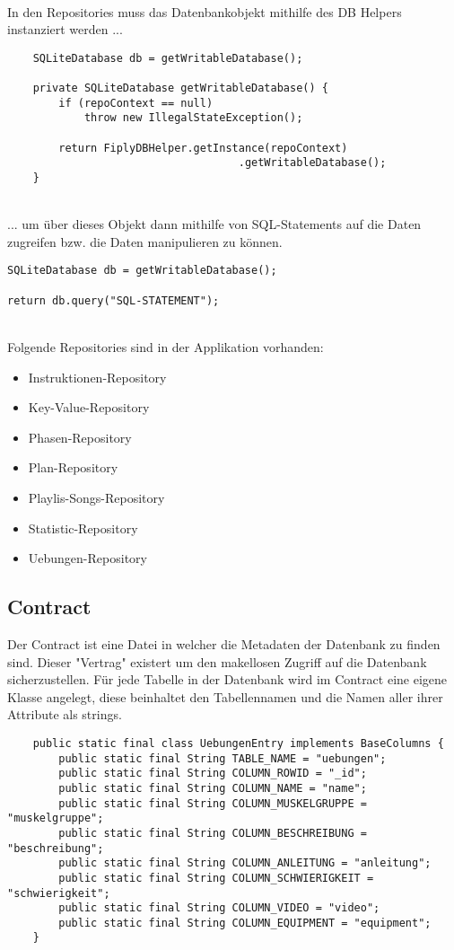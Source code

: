\documentclass[FIPLY_base.tex]{subfiles}
\begin{document}
\ \\
In den Repositories muss das Datenbankobjekt mithilfe des DB Helpers instanziert werden ...
\ \\
\begin{lstlisting}
    SQLiteDatabase db = getWritableDatabase();

    private SQLiteDatabase getWritableDatabase() {
        if (repoContext == null) 
            throw new IllegalStateException();
	  
        return FiplyDBHelper.getInstance(repoContext)
			      	  		        .getWritableDatabase();
    }
\end{lstlisting}
\ \\
... um über dieses Objekt dann mithilfe von SQL-Statements auf die Daten zugreifen bzw. die Daten manipulieren zu können.
\ \\
\begin{lstlisting}
SQLiteDatabase db = getWritableDatabase();

return db.query("SQL-STATEMENT");
\end{lstlisting}

\ \\
Folgende Repositories sind in der Applikation vorhanden:
\begin{itemize}
\item Instruktionen-Repository
\item Key-Value-Repository
\item Phasen-Repository
\item Plan-Repository
\item Playlis-Songs-Repository
\item Statistic-Repository
\item Uebungen-Repository
\end{itemize}

\newpage
\subsection{Contract}
Der Contract ist eine Datei in welcher die Metadaten der Datenbank zu finden sind.
Dieser "Vertrag" existert um den makellosen Zugriff auf die Datenbank sicherzustellen.
Für jede Tabelle in der Datenbank wird im Contract eine eigene Klasse angelegt, diese beinhaltet den Tabellennamen und die Namen aller ihrer Attribute als strings.
\begin{lstlisting}
    public static final class UebungenEntry implements BaseColumns {
        public static final String TABLE_NAME = "uebungen";
        public static final String COLUMN_ROWID = "_id";
        public static final String COLUMN_NAME = "name";
        public static final String COLUMN_MUSKELGRUPPE = "muskelgruppe";
        public static final String COLUMN_BESCHREIBUNG = "beschreibung";
        public static final String COLUMN_ANLEITUNG = "anleitung";
        public static final String COLUMN_SCHWIERIGKEIT = "schwierigkeit";
        public static final String COLUMN_VIDEO = "video";
        public static final String COLUMN_EQUIPMENT = "equipment";
    }
\end{lstlisting}
\end{document}
